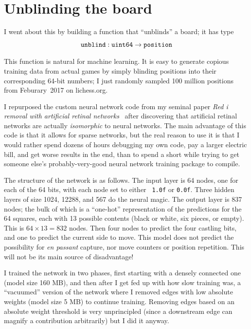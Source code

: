 \documentclass[twocolumn]{amsart}
\begin{document}
\section{Unblinding the board}

I went about this by building a function that ``unblinds'' a board; it
has type
\[
{\tt unblind} : {\tt uint64} \rightarrow {\tt position}
\]

This function is natural for machine learning. It is easy to generate
copious training data from actual games by simply blinding positions
into their corresponding 64-bit numbers; I just randomly sampled 100
million positions from Feburary~2017 on lichess.org.

I repurposed the custom neural network code from my seminal paper {\it
  Red i removal with artificial retinal networks}~\cite{redi} after
discovering that artificial retinal networks are actually {\em
  isomorphic} to neural networks. The main advantage of this code is
that it allows for sparse networks, but the real reason to use it is
that I would rather spend dozens of hours debugging my own code, pay a
larger electric bill, and get worse results in the end, than to spend
a short while trying to get someone else's probably-very-good neural
network training package to compile.

The structure of the network is as follows. The input layer is 64
nodes, one for each of the 64 bits, with each node set to either {\tt
  1.0f} or {\tt 0.0f}. Three hidden layers of size 1024, 12288, and 567
do the neural magic. The output layer is 837 nodes; the bulk of which
is a ``one-hot'' representation of the predictions for the 64 squares,
each with 13 possible contents (black or white, six pieces, or empty).
This is $64 \times 13 = 832$ nodes. Then four nodes to predict the
four castling bits, and one to predict the current side to move. This
model does not predict the possibility for {\em en passant} capture,
nor move counters or position repetition. This will not be its main
source of disadvantage!

I trained the network in two phases, first starting with a densely
connected one (model size 160 MB), and then after I get fed up with
how slow training was, a ``vacuumed'' version of the network where I
removed edges with low absolute weights (model size 5 MB) to continue
training. Removing edges based on an absolute weight threshold is
very unprincipled (since a downstream edge can magnify a contribution
arbitrarily) but I did it anyway.
\end{document}
